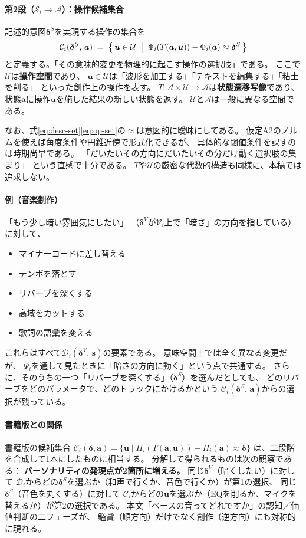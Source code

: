\documentclass[a4paper, fontsize=10pt]{jlreq}
\newcommand{\va}{\bm{a}}
\newcommand{\vs}{\bm{s}}
\newcommand{\vu}{\bm{u}}
\newcommand{\A}{\mathcal{A}}
\newcommand{\Si}{\mathcal{S}_i}
\newcommand{\Vi}{\mathcal{V}_i}
\newcommand{\Phii}{\Phi_i}
\newcommand{\Psii}{\Psi_i}
\newcommand{\Ci}{\mathcal{C}_i}
\newcommand{\U}{\mathcal{U}}
\newcommand{\dV}{\bm{\delta}^{V}}          %
\newcommand{\dS}{\bm{\delta}^{S}}          %
\newcommand{\Di}{\mathcal{D}_i}            %
\begin{document}
\paragraph{第2段（$\Si \to \A$）：操作候補集合}
記述的意図$\dS$を実現する操作の集合を
\begin{equation}\label{eq:op-set}
  \Ci(\dS,\, \va)
  \;=\;
  \bigl\{\, \vu \in \U
    \;\bigm|\;
    \Phii(T(\va,\vu)) - \Phii(\va) \approx \dS
  \,\bigr\}
\end{equation}
と定義する。「その意味的変更を物理的に起こす操作の選択肢」である。
ここで$\U$は\textbf{操作空間}であり、
$\vu \in \U$は「波形を加工する」「テキストを編集する」「粘土を削る」
といった創作上の操作を表す。
$T : \A \times \U \to \A$は\textbf{状態遷移写像}であり、
状態$\va$に操作$\vu$を施した結果の新しい状態を返す。
$\U$と$\A$は一般に異なる空間である。

なお、式\eqref{eq:desc-set}\eqref{eq:op-set}の$\approx$は意図的に曖昧にしてある。
仮定A2のノルムを使えば角度条件や円錐近傍で形式化できるが、
具体的な閾値条件を課すのは時期尚早である。
「だいたいその方向にだいたいその分だけ動く選択肢の集まり」
という直感で十分である。
$T$や$\U$の厳密な代数的構造も同様に、本稿では追求しない。

\paragraph{例（音楽制作）}
「もう少し暗い雰囲気にしたい」
（$\dV$が$\Vi$上で「暗さ」の方向を指している）
に対して、
\begin{itemize}[leftmargin=2em]
  \item マイナーコードに差し替える
  \item テンポを落とす
  \item リバーブを深くする
  \item 高域をカットする
  \item 歌詞の語彙を変える
\end{itemize}
これらはすべて$\Di(\dV,\, \vs)$の要素である。
意味空間上では全く異なる変更だが、
$\Psii$を通して見たときに「暗さの方向に動く」という点で共通する。
さらに、そのうちの一つ「リバーブを深くする」（$\dS$）を選んだとしても、
どのリバーブをどのパラメータで、どのトラックにかけるかという
$\Ci(\dS,\, \va)$からの選択が残っている。

\paragraph{書籍版との関係}
書籍版の候補集合
$\Ci(\bm{\delta}, \va) = \{\vu \mid \Pi_i(T(\va,\vu)) - \Pi_i(\va) \approx \bm{\delta}\}$
は、二段階を合成して1本にしたものに相当する。
分解して得られるものは次の観察である：
\textbf{パーソナリティの発現点が2箇所に増える。}
同じ$\dV$（暗くしたい）に対して
$\Di$からどの$\dS$を選ぶか（和声で行くか、音色で行くか）が第1の選択、
同じ$\dS$（音色を丸くする）に対して
$\Ci$からどの$\vu$を選ぶか（EQを削るか、マイクを替えるか）が第2の選択である。
本文「ベースの音ってどれですか」の認知／価値判断の二フェーズが、
鑑賞（順方向）だけでなく創作（逆方向）にも対称的に現れる。
\end{document}
